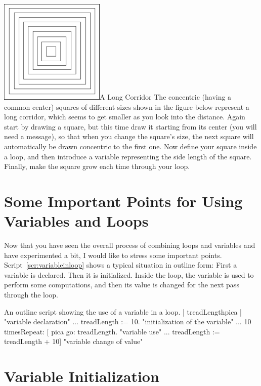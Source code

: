 \documentclass[a4paper,10pt,twoside]{book}
\begin{document}
\begin{exofigwithsizeandtitle}[0.5]{\includegraphics[width=5cm]{corridor}}{A Long Corridor}
The concentric (having a common center) squares of different sizes shown in the figure below represent a long corridor, which seems to get smaller as you look into the distance. Again start by drawing a square, but this time draw it starting from its center (you will need a  message), so that when you change the square's size, the next square will automatically be drawn concentric to the first one. Now define your square inside a loop, and then introduce a variable  representing the side length of the square. Finally, make the square grow each time through your loop. 
\end{exofigwithsizeandtitle}


\section{Some Important Points for Using Variables and Loops}

Now that you have seen the overall process of combining loops and variables and have experimented a bit, I would like to stress some important points. Script~\ref{scr:variableinloop} shows a typical situation in outline form: First a variable is declared. Then it is initialized. Inside the loop, the variable is used to perform some computations, and then its value is changed for the next pass through the loop. 

\begin{script}[variableinloop]{An outline script showing the use of a variable in a loop.}
| treadLengthpica |                "variable declaration" 
...   
treadLength := 10.                  "initialization of the variable" 
...  
10 timesRepeat:  
[ pica go: treadLength.        "variable use" 
...  
treadLength := treadLength + 10]   "variable change of value" 
\end{script}


\section{Variable Initialization} 
\end{document}
